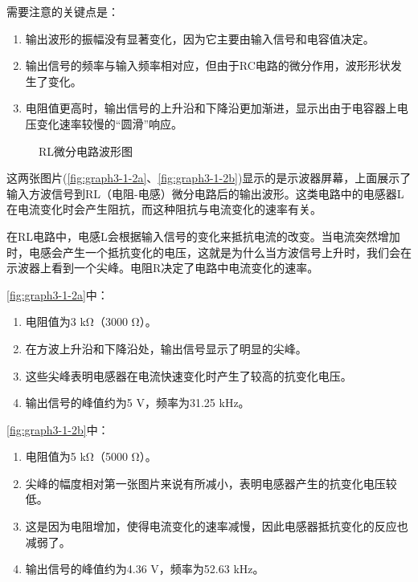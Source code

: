 \documentclass[dvipsnames, svgnames,a4paper,11pt]{article}
\begin{document}
\begin{enumerate}
		需要注意的关键点是：
		\begin{enumerate}
			\item 输出波形的振幅没有显著变化，因为它主要由输入信号和电容值决定。
			\item 输出信号的频率与输入频率相对应，但由于RC电路的微分作用，波形形状发生了变化。
			\item 电阻值更高时，输出信号的上升沿和下降沿更加渐进，显示出由于电容器上电压变化速率较慢的“圆滑”响应。
			
		\end{enumerate}

		
		\begin{figure}[htbp]
			\centering
			\quad
			\quad
			\caption{RL微分电路波形图}
			\label{fig:graph3-1-2}
		\end{figure}
		
		这两张图片(\cref{fig:graph3-1-2a}、\cref{fig:graph3-1-2b})显示的是示波器屏幕，上面展示了输入方波信号到RL（电阻-电感）微分电路后的输出波形。这类电路中的电感器L在电流变化时会产生阻抗，而这种阻抗与电流变化的速率有关。
		
		在RL电路中，电感L会根据输入信号的变化来抵抗电流的改变。当电流突然增加时，电感会产生一个抵抗变化的电压，这就是为什么当方波信号上升时，我们会在示波器上看到一个尖峰。电阻R决定了电路中电流变化的速率。
		
		\cref{fig:graph3-1-2a}中：
		\begin{enumerate}
			\item 电阻值为3 kΩ（3000 Ω）。
			\item 在方波上升沿和下降沿处，输出信号显示了明显的尖峰。
			\item 这些尖峰表明电感器在电流快速变化时产生了较高的抗变化电压。
			\item 输出信号的峰值约为5 V，频率为31.25 kHz。
		\end{enumerate}
	
		
		\cref{fig:graph3-1-2b}中：
		\begin{enumerate}
			\item 电阻值为5 kΩ（5000 Ω）。
			\item 尖峰的幅度相对第一张图片来说有所减小，表明电感器产生的抗变化电压较低。
			\item 这是因为电阻增加，使得电流变化的速率减慢，因此电感器抵抗变化的反应也减弱了。
			\item 输出信号的峰值约为4.36 V，频率为52.63 kHz。
		\end{enumerate}


\end{enumerate}
\end{document}
